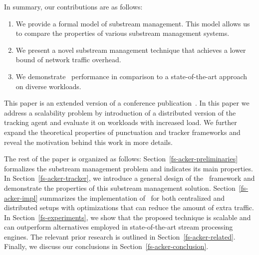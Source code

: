 In summary, our contributions are as follows:
\begin{enumerate}
    \item We provide a formal model of substream management. This model allows us to compare the properties of various substream management systems.
    \item We present a novel substream management technique that achieves a lower bound of network traffic overhead.
    \item We demonstrate \tracker\ performance in comparison to a state-of-the-art approach on diverse workloads.
\end{enumerate}

This paper is an extended version of a conference publication~\cite{10.1145/3524860.3539809}. In this paper we address a scalability problem by introduction of a distributed version of the tracking agent and evaluate it on workloads with increased load. We further expand the theoretical properties of punctuation and tracker frameworks and reveal the motivation behind this work in more details.

The rest of the paper is organized as follows: Section~\ref{fs-acker-preliminaries} formalizes the substream management problem and indicates its main properties. In Section~\ref{fs-acker-tracker}, we introduce a general design of the \tracker\ framework and demonstrate the properties of this substream management solution. Section~\ref{fs-acker-impl} summarizes the implementation of \tracker\ for both centralized and distributed setups with optimizations that can reduce the amount of extra traffic. In Section~\ref{fs-experiments}, we show that the proposed technique is scalable and can outperform alternatives employed in state-of-the-art stream processing engines. The relevant prior research is outlined in Section~\ref{fs-acker-related}. Finally, we discuss our conclusions in Section~\ref{fs-acker-conclusion}.